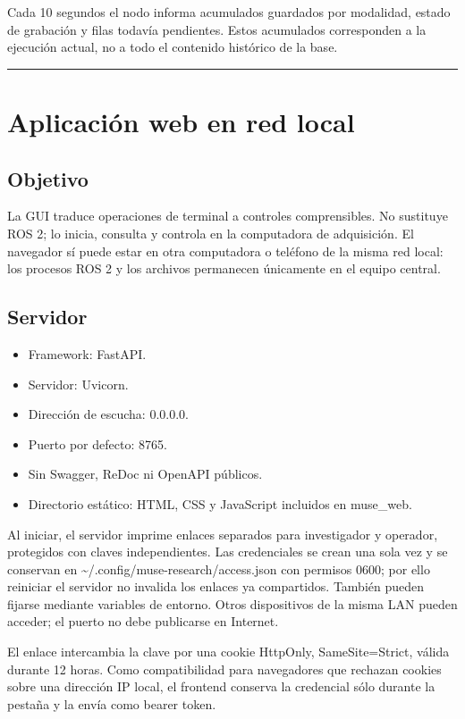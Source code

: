 \documentclass[11pt,a4paper]{article}
\begin{document}
Cada 10 segundos el nodo informa acumulados guardados por modalidad, estado de grabación y filas todavía pendientes. Estos acumulados corresponden a la ejecución actual, no a todo el contenido histórico de la base.

\medskip\hrule\medskip

\section{Aplicación web en red local}

\subsection{Objetivo}

La GUI traduce operaciones de terminal a controles comprensibles. No sustituye ROS 2; lo
inicia, consulta y controla en la computadora de adquisición. El navegador sí puede estar
en otra computadora o teléfono de la misma red local: los procesos ROS 2 y los archivos
permanecen únicamente en el equipo central.

\subsection{Servidor}

\begin{itemize}
\item Framework: FastAPI.
\item Servidor: Uvicorn.
\item Dirección de escucha: {\ttfamily\small 0.0.0.0}.
\item Puerto por defecto: {\ttfamily\small 8765}.
\item Sin Swagger, ReDoc ni OpenAPI públicos.
\item Directorio estático: HTML, CSS y JavaScript incluidos en {\ttfamily\small muse\_web}.
\end{itemize}

Al iniciar, el servidor imprime enlaces separados para investigador y operador, protegidos
con claves independientes. Las credenciales se crean una sola vez y se conservan en
{\ttfamily\small \textasciitilde{}/.config/muse-research/access.json} con permisos
{\ttfamily\small 0600}; por ello reiniciar el servidor no invalida los enlaces ya
compartidos. También pueden fijarse mediante variables de entorno. Otros dispositivos de
la misma LAN pueden acceder; el puerto no debe publicarse en Internet.

El enlace intercambia la clave por una cookie {\ttfamily\small HttpOnly},
{\ttfamily\small SameSite=Strict}, válida durante 12 horas. Como compatibilidad para
navegadores que rechazan cookies sobre una dirección IP local, el frontend conserva la
credencial sólo durante la pestaña y la envía como bearer token.
\end{document}
